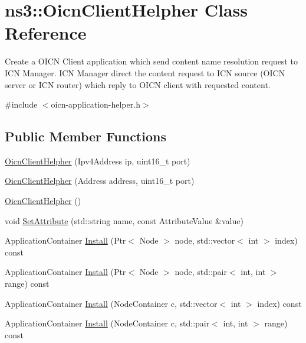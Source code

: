 \hypertarget{classns3_1_1OicnClientHelpher}{\section{ns3\-:\-:Oicn\-Client\-Helpher Class Reference}
\label{classns3_1_1OicnClientHelpher}
}


Create a O\-I\-C\-N Client application which send content name resolution request to I\-C\-N Manager. I\-C\-N Manager direct the content request to I\-C\-N source (O\-I\-C\-N server or I\-C\-N router) which reply to O\-I\-C\-N client with requested content.  




{\ttfamily \#include $<$oicn-\/application-\/helper.\-h$>$}

\subsection*{Public Member Functions}
\begin{DoxyCompactItemize}
\item 
\hyperlink{classns3_1_1OicnClientHelpher_a8619c2f71ef3fc04f2b348dffe1ba98f}{Oicn\-Client\-Helpher} (Ipv4\-Address ip, uint16\-\_\-t port)
\item 
\hyperlink{classns3_1_1OicnClientHelpher_a34e23eea59e35ca63a59a4afcabc52cf}{Oicn\-Client\-Helpher} (Address address, uint16\-\_\-t port)
\item 
\hyperlink{classns3_1_1OicnClientHelpher_a9cc046926b6ed35a81453acbbd3b96a6}{Oicn\-Client\-Helpher} ()
\item 
void \hyperlink{classns3_1_1OicnClientHelpher_a11a83c357296fef47c261de8e5773c8f}{Set\-Attribute} (std\-::string name, const Attribute\-Value \&value)
\item 
Application\-Container \hyperlink{classns3_1_1OicnClientHelpher_a9092f106877f63dc98d290c8e58062af}{Install} (Ptr$<$ Node $>$ node, std\-::vector$<$ int $>$ index) const 
\item 
Application\-Container \hyperlink{classns3_1_1OicnClientHelpher_a1e40ddee6d66de8f8aabc6099e8499ba}{Install} (Ptr$<$ Node $>$ node, std\-::pair$<$ int, int $>$ range) const 
\item 
Application\-Container \hyperlink{classns3_1_1OicnClientHelpher_a7f475089dfdd7c221dada95b84ace165}{Install} (Node\-Container c, std\-::vector$<$ int $>$ index) const 
\item 
Application\-Container \hyperlink{classns3_1_1OicnClientHelpher_a97dfea27ebd1fea82d7055fbcba83e20}{Install} (Node\-Container c, std\-::pair$<$ int, int $>$ range) const 
\end{DoxyCompactItemize}
